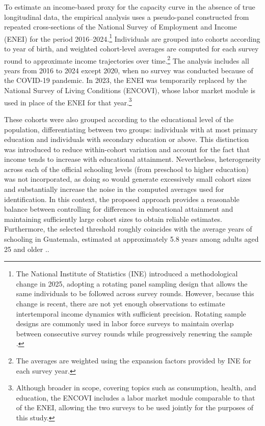 \documentclass{article}
\begin{document}
To estimate an income-based proxy for the capacity curve in the absence of true longitudinal data, the empirical analysis uses a pseudo-panel constructed from repeated cross-sections of the National Survey of Employment and Income (ENEI) for the period 2016--2024.\footnote{The National Institute of Statistics (INE) introduced a methodological change in 2025, adopting a rotating panel sampling design that allows the same individuals to be followed across survey rounds. However, because this change is recent, there are not yet enough observations to estimate intertemporal income dynamics with sufficient precision. Rotating sample designs are commonly used in labor force surveys to maintain overlap between consecutive survey rounds while progressively renewing the sample \parencite{ilo2014sampling}.} Individuals are grouped into cohorts according to year of birth, and weighted cohort-level averages  are computed for each survey round to approximate income trajectories over time.\footnote{The averages are weighted using the expansion factors provided by INE for each survey year.} The analysis includes all years from 2016 to 2024 except 2020, when no survey was conducted because of the COVID-19 pandemic. In 2023, the ENEI was temporarily replaced by the National Survey of Living Conditions (ENCOVI), whose labor market module is used in place of the ENEI for that year.\footnote{Although broader in scope, covering topics such as consumption, health, and education, the ENCOVI includes a labor market module comparable to that of the ENEI, allowing the two surveys to be used jointly for the purposes of this study.}

These cohorts were also grouped according to the educational level of the population, differentiating between two groups: individuals with at most primary education and individuals with secondary education or above. This distinction was introduced to reduce within-cohort variation and account for the fact that income tends to increase with educational attainment. Nevertheless, heterogeneity across each of the official schooling levels (from preschool to higher education) was not incorporated, as doing so would generate excessively small cohort sizes and substantially increase the noise in the computed averages used for identification. In this context, the proposed approach provides a reasonable balance between controlling for differences in educational attainment and maintaining sufficiently large cohort sizes to obtain reliable estimates. Furthermore, the selected threshold roughly coincides with the average years of schooling in Guatemala, estimated at approximately 5.8 years among adults aged 25 and older \parencite{undp2025guatemala}..
\end{document}
